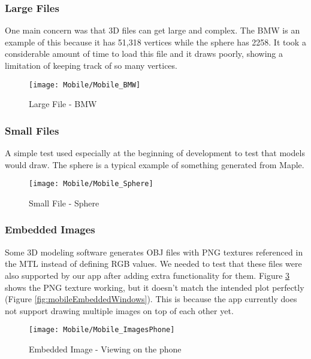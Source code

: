         \subsubsection{Large Files}
        
            One main concern was that 3D files can get large and complex. The BMW is an example of this because it has 51,318 vertices while the sphere has 2258. It took a considerable amount of time to load this file and it draws poorly, showing a limitation of keeping track of so many vertices.
            \begin{figure}[H]
                \texttt{[image: Mobile/Mobile\_BMW]}
                \centering
                \caption{Large File - BMW}
                \label{fig:mobileBMW}
            \end{figure}
    
        \subsubsection{Small Files}
            A simple test used especially at the beginning of development to test that models would draw. The sphere is a typical example of something generated from Maple. 
        
            \begin{figure}[H]
                \texttt{[image: Mobile/Mobile\_Sphere]}
                \centering
                \caption{Small File - Sphere}
                \label{fig:mobileSphere}
            \end{figure}
            
        \subsubsection{Embedded Images}
            
            Some 3D modeling software generates OBJ files with PNG textures referenced in the MTL instead of defining RGB values. We needed to test that these files were also supported by our app after adding extra functionality for them. Figure \ref{fig:mobileEmbeddedPhone} shows the PNG texture working, but it doesn't match the intended plot perfectly (Figure \ref{fig:mobileEmbeddedWindows}). This is because the app currently does not support drawing multiple images on top of each other yet.
        
            \begin{figure}[H]
                \texttt{[image: Mobile/Mobile\_ImagesPhone]}
                \centering
                \caption{Embedded Image - Viewing on the phone}
                \label{fig:mobileEmbeddedPhone}
            \end{figure}

